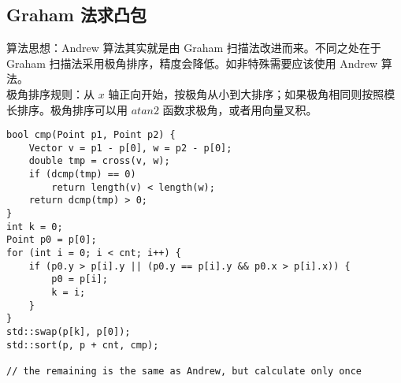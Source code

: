 \subsection {Graham 法求凸包}

\noindent 算法思想：Andrew 算法其实就是由 Graham 扫描法改进而来。不同之处在于 Graham 扫描法采用极角排序，精度会降低。如非特殊需要应该使用 Andrew 算法。 \\ 

极角排序规则：从 $x$ 轴正向开始，按极角从小到大排序；如果极角相同则按照模长排序。极角排序可以用 $atan2$ 函数求极角，或者用向量叉积。

\begin{verbatim}
bool cmp(Point p1, Point p2) {
    Vector v = p1 - p[0], w = p2 - p[0];
    double tmp = cross(v, w);
    if (dcmp(tmp) == 0)
        return length(v) < length(w);
    return dcmp(tmp) > 0;
}
int k = 0;
Point p0 = p[0];
for (int i = 0; i < cnt; i++) {
    if (p0.y > p[i].y || (p0.y == p[i].y && p0.x > p[i].x)) {
        p0 = p[i];
        k = i;
    }
}
std::swap(p[k], p[0]);
std::sort(p, p + cnt, cmp);

// the remaining is the same as Andrew, but calculate only once
\end{verbatim}
